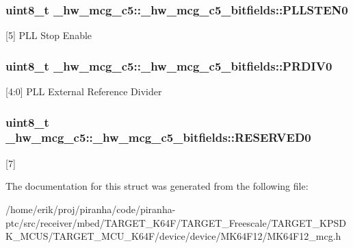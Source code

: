 \subsubsection[{\texorpdfstring{P\+L\+L\+S\+T\+E\+N0}{PLLSTEN0}}]{\setlength{\rightskip}{0pt plus 5cm}uint8\+\_\+t \+\_\+hw\+\_\+mcg\+\_\+c5\+::\+\_\+hw\+\_\+mcg\+\_\+c5\+\_\+bitfields\+::\+P\+L\+L\+S\+T\+E\+N0}\hypertarget{struct__hw__mcg__c5_1_1__hw__mcg__c5__bitfields_a3957a4b3c34034c64784163e7fcc6bb0}{}\label{struct__hw__mcg__c5_1_1__hw__mcg__c5__bitfields_a3957a4b3c34034c64784163e7fcc6bb0}
\mbox{[}5\mbox{]} P\+LL Stop Enable 
\subsubsection[{\texorpdfstring{P\+R\+D\+I\+V0}{PRDIV0}}]{\setlength{\rightskip}{0pt plus 5cm}uint8\+\_\+t \+\_\+hw\+\_\+mcg\+\_\+c5\+::\+\_\+hw\+\_\+mcg\+\_\+c5\+\_\+bitfields\+::\+P\+R\+D\+I\+V0}\hypertarget{struct__hw__mcg__c5_1_1__hw__mcg__c5__bitfields_ac1b19895a9dbd3a00c1f47e602ba0536}{}\label{struct__hw__mcg__c5_1_1__hw__mcg__c5__bitfields_ac1b19895a9dbd3a00c1f47e602ba0536}
\mbox{[}4\+:0\mbox{]} P\+LL External Reference Divider 
\subsubsection[{\texorpdfstring{R\+E\+S\+E\+R\+V\+E\+D0}{RESERVED0}}]{\setlength{\rightskip}{0pt plus 5cm}uint8\+\_\+t \+\_\+hw\+\_\+mcg\+\_\+c5\+::\+\_\+hw\+\_\+mcg\+\_\+c5\+\_\+bitfields\+::\+R\+E\+S\+E\+R\+V\+E\+D0}\hypertarget{struct__hw__mcg__c5_1_1__hw__mcg__c5__bitfields_a10d93c6d47987e2d8444c319bb02a63c}{}\label{struct__hw__mcg__c5_1_1__hw__mcg__c5__bitfields_a10d93c6d47987e2d8444c319bb02a63c}
\mbox{[}7\mbox{]} 

The documentation for this struct was generated from the following file\+:\begin{DoxyCompactItemize}
\item 
/home/erik/proj/piranha/code/piranha-\/ptc/src/receiver/mbed/\+T\+A\+R\+G\+E\+T\+\_\+\+K64\+F/\+T\+A\+R\+G\+E\+T\+\_\+\+Freescale/\+T\+A\+R\+G\+E\+T\+\_\+\+K\+P\+S\+D\+K\+\_\+\+M\+C\+U\+S/\+T\+A\+R\+G\+E\+T\+\_\+\+M\+C\+U\+\_\+\+K64\+F/device/device/\+M\+K64\+F12/M\+K64\+F12\+\_\+mcg.\+h\end{DoxyCompactItemize}
